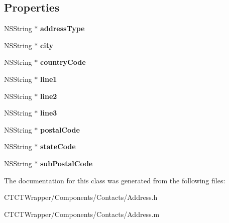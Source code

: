 \subsection*{Properties}
\begin{DoxyCompactItemize}
\item 
\hypertarget{interface_address_a1dfe784ca902520df620eff595d9c508}{N\-S\-String $\ast$ {\bfseries address\-Type}}\label{interface_address_a1dfe784ca902520df620eff595d9c508}

\item 
\hypertarget{interface_address_ad47d0a1fe7c82b2c247f33cd745380df}{N\-S\-String $\ast$ {\bfseries city}}\label{interface_address_ad47d0a1fe7c82b2c247f33cd745380df}

\item 
\hypertarget{interface_address_a8f80be382f87d243579dcb31c8ae1d09}{N\-S\-String $\ast$ {\bfseries country\-Code}}\label{interface_address_a8f80be382f87d243579dcb31c8ae1d09}

\item 
\hypertarget{interface_address_aa8393bdb98aa8a6f9abd997e12acdecd}{N\-S\-String $\ast$ {\bfseries line1}}\label{interface_address_aa8393bdb98aa8a6f9abd997e12acdecd}

\item 
\hypertarget{interface_address_a9c46d3e585f0b05031b7b48a3755037b}{N\-S\-String $\ast$ {\bfseries line2}}\label{interface_address_a9c46d3e585f0b05031b7b48a3755037b}

\item 
\hypertarget{interface_address_adb8395d68afe00ae8bd72871c5d6e3fa}{N\-S\-String $\ast$ {\bfseries line3}}\label{interface_address_adb8395d68afe00ae8bd72871c5d6e3fa}

\item 
\hypertarget{interface_address_aa8e603be41326e86b6a15edff1b1588c}{N\-S\-String $\ast$ {\bfseries postal\-Code}}\label{interface_address_aa8e603be41326e86b6a15edff1b1588c}

\item 
\hypertarget{interface_address_abc54f84b280bc9ab6e8017f2bd62610b}{N\-S\-String $\ast$ {\bfseries state\-Code}}\label{interface_address_abc54f84b280bc9ab6e8017f2bd62610b}

\item 
\hypertarget{interface_address_a93d53fa65fc90ec08e491c2d285f10e8}{N\-S\-String $\ast$ {\bfseries sub\-Postal\-Code}}\label{interface_address_a93d53fa65fc90ec08e491c2d285f10e8}

\end{DoxyCompactItemize}


The documentation for this class was generated from the following files\-:\begin{DoxyCompactItemize}
\item 
C\-T\-C\-T\-Wrapper/\-Components/\-Contacts/Address.\-h\item 
C\-T\-C\-T\-Wrapper/\-Components/\-Contacts/Address.\-m\end{DoxyCompactItemize}
